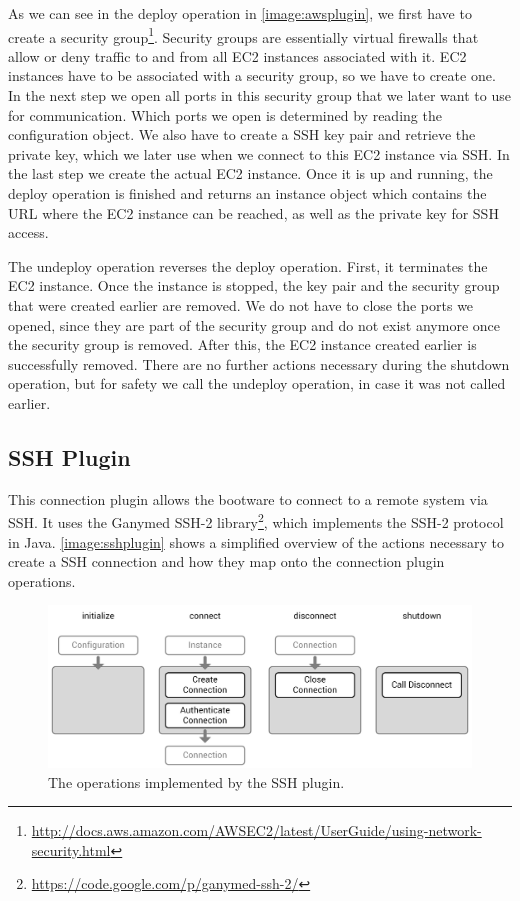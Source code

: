 As we can see in the deploy operation in \autoref{image:awsplugin}, we first have to create a security group\footnote{\url{http://docs.aws.amazon.com/AWSEC2/latest/UserGuide/using-network-security.html}}.
Security groups are essentially virtual firewalls that allow or deny traffic to and from all EC2 instances associated with it.
EC2 instances have to be associated with a security group, so we have to create one.
In the next step we open all ports in this security group that we later want to use for communication.
Which ports we open is determined by reading the configuration object.
We also have to create a SSH key pair and retrieve the private key, which we later use when we connect to this EC2 instance via SSH.
In the last step we create the actual EC2 instance.
Once it is up and running, the deploy operation is finished and returns an instance object which contains the URL where the EC2 instance can be reached, as well as the private key for SSH access.

The undeploy operation reverses the deploy operation.
First, it terminates the EC2 instance.
Once the instance is stopped, the key pair and the security group that were created earlier are removed.
We do not have to close the ports we opened, since they are part of the security group and do not exist anymore once the security group is removed.
After this, the EC2 instance created earlier is successfully removed.
There are no further actions necessary during the shutdown operation, but for safety we call the undeploy operation, in case it was not called earlier.

\subsection{SSH Plugin}

This connection plugin allows the bootware to connect to a remote system via SSH.
It uses the Ganymed SSH-2 library\footnote{\url{https://code.google.com/p/ganymed-ssh-2/}}, which implements the SSH-2 protocol in Java.
\autoref{image:sshplugin} shows a simplified overview of the actions necessary to create a SSH connection and how they map onto the connection plugin operations.

\begin{figure}[!htbp]
	\centering
	\includegraphics[resolution=600]{implementation/assets/ssh_plugin}
	\caption{The operations implemented by the SSH plugin.}
	\label{image:sshplugin}
\end{figure}

